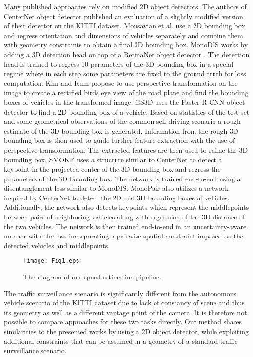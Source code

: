 \documentclass[twocolumn]{svjour3}          \smartqed  \usepackage{graphicx}
\begin{document}
Many published approaches rely on modified 2D object detectors. The authors of CenterNet object detector published \cite{CenterNet} an evaluation of a slightly modified version of their detector on the KITTI dataset. Mousavian et al. \cite{mousavian} use a 2D bounding box and regress orientation and dimensions of vehicles separately and combine them with geometry constraints to obtain a final 3D bounding box. MonoDIS \cite{simonelli} works by adding a 3D detection head on top of a RetinaNet object detector \cite{RetinaNet}. The detection head is trained to regress 10 parameters of the 3D bounding box in a special regime where in each step some parameters are fixed to the ground truth for loss computation. Kim and Kum \cite{kim} propose to use perspective transformation on the image to create a rectified birds eye view of the road plane and find the bounding boxes of vehicles in the transformed image. GS3D \cite{gs3d} uses the Faster R-CNN \cite{FasterRCNN} object detector to find a 2D bounding box of a vehicle. Based on statistics of the test set and some geometrical observations of the common self-driving scenario a rough estimate of the 3D bounding box is generated. Information from the rough 3D bounding box is then used to guide further feature extraction with the use of perspective transformation. The extracted features are then used to refine the 3D bounding box. SMOKE \cite{smoke} uses a structure similar to CenterNet to detect a keypoint in the projected center of the 3D bounding box and regress the parameters of the 3D bounding box. The network is trained end-to-end using a disentanglement loss similar to MonoDIS. MonoPair \cite{monopair} also utilizes a network inspired by CenterNet to detect the 2D and 3D bounding boxes of vehicles. Additionally, the network also detects keypoints which represent the middlepoints between pairs of neighboring vehicles along with regression of the 3D distance of the two vehicles. The network is then trained end-to-end in an uncertainty-aware manner \cite{uncertain} with the loss incorporating a pairwise spatial constraint imposed on the detected vehicles and middlepoints.

\begin{figure*}[t]
   \centering
   \texttt{[image: Fig1.eps]}
   \caption{The diagram of our speed estimation pipeline.}
   \label{fig:diagram}
\end{figure*}

The traffic surveillance scenario is significantly different from the autonomous vehicle scenario of the KITTI dataset due to lack of constancy of scene and thus its geometry as well as a different vantage point of the camera. It is therefore not possible to compare approaches for these two tasks directly. Our method shares similarities to the presented works by using a 2D object detector, while exploiting additional constraints that can be assumed in a geometry of a standard traffic surveillance scenario.
\end{document}
